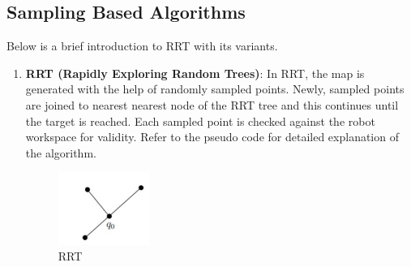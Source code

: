 \documentclass{IEEEtran}
\begin{document}
\subsection{\textbf{Sampling Based Algorithms}}
Below is a brief introduction to RRT with its variants.
\begin{enumerate}

\item \textbf{RRT (Rapidly Exploring Random Trees)}: In RRT, the map  is generated with the help of randomly sampled points. 
Newly, sampled points are joined to nearest nearest node of the RRT tree and this continues  until the target is reached. 
Each sampled point is checked against the robot workspace for validity. Refer to the pseudo code for detailed explanation of the 
algorithm.

\begin{figure}[h]
    \centering
    \includegraphics[width=3cm]{RRT1}
    \caption{RRT}
    \label{fig:RRT}
\end{figure}


\end{enumerate}
\end{document}
